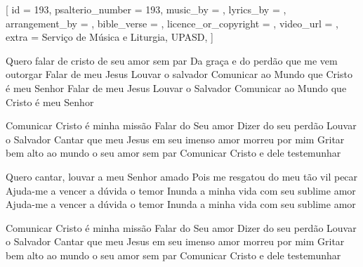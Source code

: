 [
    id                     = {193},
    psalterio_number       = {193},
    music_by               = {},
    lyrics_by              = {},
    arrangement_by         = {},
    bible_verse            = {},
    licence_or_copyright   = {},
    video_url              = {},
    extra                  = {Serviço de Música e Liturgia, UPASD},
]


\beginverse
Quero falar de cristo de seu amor sem par
Da graça e do perdão que me vem outorgar
Falar de meu Jesus Louvar o salvador
Comunicar ao Mundo que Cristo é meu Senhor
Falar de meu Jesus Louvar o Salvador
Comunicar ao Mundo que Cristo é meu Senhor
\endverse


\beginchorus
Comunicar Cristo é minha missão
Falar do Seu amor
Dizer do seu perdão
Louvar o Salvador
Cantar que meu Jesus em seu imenso amor morreu por mim
Gritar bem alto ao mundo o seu amor sem par
Comunicar Cristo e dele testemunhar
\endchorus




\beginverse
Quero cantar, louvar a meu Senhor amado
Pois me resgatou do meu tão vil pecar
Ajuda-me a vencer a dúvida o temor
Inunda a minha vida com seu sublime amor
Ajuda-me a vencer a dúvida o temor
Inunda a minha vida com seu sublime amor
\endverse


\beginchorus
Comunicar Cristo é minha missão
Falar do Seu amor
Dizer do seu perdão
Louvar o Salvador
Cantar que meu Jesus em seu imenso amor morreu por mim
Gritar bem alto ao mundo o seu amor sem par
Comunicar Cristo e dele testemunhar
\endchorus

\endsong
